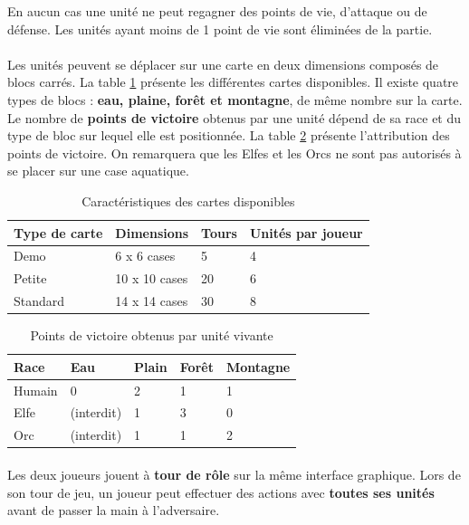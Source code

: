 En aucun cas une unité ne peut regagner des points de vie, d'attaque ou de défense. Les unités ayant moins de 1 point de vie sont éliminées de la partie.

\paragraph{}
Les unités peuvent se déplacer sur une carte en deux dimensions composés de blocs carrés. La table \ref{fig:map_types} présente les différentes cartes disponibles.
Il existe quatre types de blocs : \textbf{eau, plaine, forêt et montagne}, de même nombre sur la carte. Le nombre de \textbf{points de victoire} obtenus par une unité dépend de sa race et du type de bloc sur lequel elle est positionnée.
La table \ref{fig:victory_points} présente l'attribution des points de victoire. On remarquera que les Elfes et les Orcs ne sont pas autorisés à se placer sur une case aquatique.

\begin{table}[h!]
  \centering
  \begin{tabular}{|l|l|l|l|}
    \hline
    Type de carte&Dimensions&Tours&Unités par joueur\\
    \hline
    Demo&6 x 6 cases&5&4\\
    \hline
    Petite&10 x 10 cases&20&6\\
    \hline
    Standard&14 x 14 cases&30&8\\
    \hline
  \end{tabular}
  \caption{Caractéristiques des cartes disponibles}
  \label{fig:map_types}
\end{table}

\begin{table}[h!]
  \centering
  \begin{tabular}{|l|l|l|l|l|}
    \hline
    Race&Eau&Plain&Forêt&Montagne\\
    \hline
    Humain&0&2&1&1\\
    \hline
    Elfe&(interdit)&1&3&0\\
    \hline
    Orc&(interdit)&1&1&2\\
    \hline
  \end{tabular}
  \caption{Points de victoire obtenus par unité vivante}
  \label{fig:victory_points}
\end{table}

\paragraph{}
Les deux joueurs jouent à \textbf{tour de rôle} sur la même interface graphique. Lors de son tour de jeu, un joueur peut effectuer des actions avec \textbf{toutes ses unités} avant de passer la main à l'adversaire.

